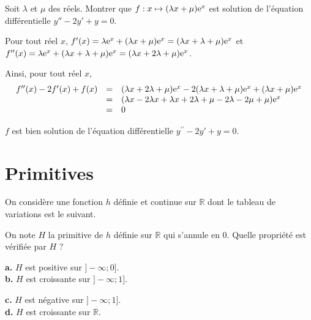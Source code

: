 \documentclass[11pt,fleqn, openany]{book} %
\begin{document}
\begin{exercise}[topic=diff01]Soit $\lambda$ et $\mu$ des réels. Montrer que $f:x\mapsto (\lambda x + \mu)\mathrm{e}^{x}$ est solution de l'équation différentielle $y''-2y'+y=0$.\end{exercise}

\begin{solution}

Pour tout réel \(x\), $f'(x)= \lambda \mathrm{e}^x + (\lambda x + \mu) \mathrm{e}^x = (\lambda x + \lambda + \mu) \mathrm{e}^x$
et $f^{\prime\prime}(x)=\lambda \mathrm{e}^x + (\lambda x + \lambda + \mu) \mathrm{e}^x = (\lambda x + 2\lambda + \mu) \mathrm{e}^x$.

Ainsi, pour tout réel \(x\),
\[\begin{array}{rcl}f^{\prime\prime}(x)-2f'(x)+f(x)&=&(\lambda x + 2\lambda + \mu) \mathrm{e}^x - 2 (\lambda x + \lambda + \mu) \mathrm{e}^x + (\lambda x + \mu)\mathrm{e}^{x} \\ &=& (\lambda x - 2 \lambda x + \lambda x +2 \lambda + \mu -2 \lambda - 2 \mu + \mu)\mathrm{e}^x \\&=&0\end{array}\]

\(f\) est bien solution de l'équation différentielle \(y^{\prime\prime}-2y'+y=0\).

\end{solution}



\section*{Primitives}

\begin{exercise}[topic=diff02, subtitle={(Centres étrangers 2023)}]On considère une fonction $h$ définie et continue sur $\mathbb{R}$ dont le tableau de variations est le suivant.

\begin{center}
\end{center}
On note $H$ la primitive de $h$ définie sur $\mathbb{R}$ qui s'annule en 0. Quelle propriété est vérifiée par $H$ ?

\begin{minipage}{0.45\linewidth}
\textbf{a.} $H$ est positive sur $]-\infty ;0]$. \\
\textbf{b.} $H$ est croissante sur $]-\infty ;1]$.
\end{minipage}\hfill \begin{minipage}{0.45\linewidth}
\textbf{c.} $H$ est négative sur $]-\infty ;1]$. \\
\textbf{d.} $H$ est croissante sur $\mathbb{R}$.
\end{minipage}
\end{exercise}
\end{document}
